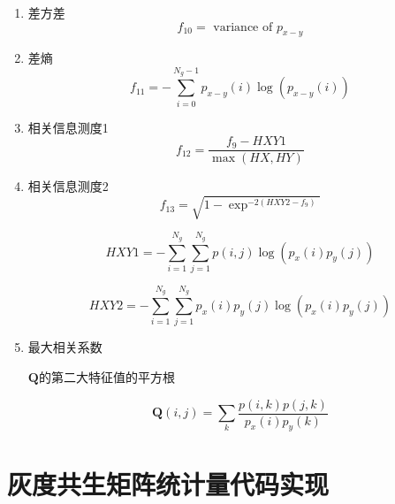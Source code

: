 \begin{enumerate}
	\item 差方差
	\begin{equation}
f_{10}=\text { variance of } p_{x-y}
\end{equation}

	\item 差熵
\begin{equation}
f_{11}=-\sum_{i=0}^{N_g-1} p_{x-y}(i) \log \left(p_{x-y}(i)\right)
\end{equation}
	\item 相关信息测度1
\begin{equation}
f_{12}=\frac{f_9-H X Y 1}{\max (H X, H Y)}
\end{equation}

	\item 相关信息测度2
\begin{equation}
f_{13}=\sqrt{1-\exp ^{-2\left(H X Y 2-f_9\right)}}
\end{equation}

\begin{equation}
H X Y 1=-\sum_{i=1}^{N_g} \sum_{j=1}^{N_g} p(i, j) \log \left(p_x(i) p_y(j)\right)
\end{equation}

\begin{equation}
H X Y 2=-\sum_{i=1}^{N_g} \sum_{j=1}^{N_g} p_x(i) p_y(j) \log \left(p_x(i) p_y(j)\right)
\end{equation}

	\item 最大相关系数
	
	$\mathbf{Q}$的第二大特征值的平方根
	
	\begin{equation}
		\mathbf{Q}(i, j)=\sum_k \frac{p(i, k) p(j, k)}{p_x(i) p_y(k)}
	\end{equation}
	
\end{enumerate}


\section{灰度共生矩阵统计量代码实现}

\vspace{0.3cm}


